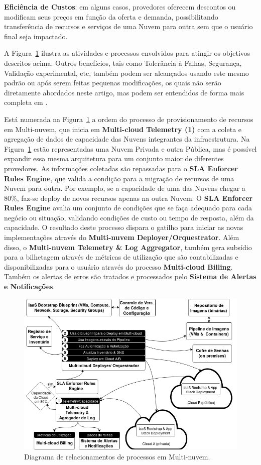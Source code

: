 \documentclass[12pt]{article}
\begin{document}
	\textbf{Eficiência de Custos}: em alguns casos, provedores oferecem descontos ou modificam seus preços em função da oferta e demanda, possibilitando transferência de recursos e serviços de uma Nuvem para outra sem que o usuário final seja impactado.
	
	A Figura~\ref{fig:figure1} ilustra as atividades e processos envolvidos para atingir os objetivos descritos acima. Outros benefícios, tais como Tolerância à Falhas, Segurança, Validação experimental, etc, também podem ser alcançados usando este mesmo padrão ou após serem feitas pequenas modificações, os quais não serão diretamente abordados neste artigo, mas podem ser entendidos de forma mais completa em \cite{Fisher:2018}.
	
	Está numerada na Figura~\ref{fig:figure1} a ordem do processo de provisionamento de recursos em Multi-nuvem, que inicia em \textbf{Multi-cloud Telemetry (1)} com a coleta e agregação de dados de capacidade das Nuvens integrantes da infraestrutura. Na Figura~\ref{fig:figure1} estão representadas uma Nuvem Privada e outra Pública, mas é possível expandir essa mesma arquitetura para um conjunto maior de diferentes provedores. As informações coletadas são repassadas para o \textbf{SLA Enforcer Rules Engine}, que valida a condição para a migração de recursos de uma Nuvem para outra. Por exemplo, se a capacidade de uma das Nuvens chegar a 80\%, faz-se deploy de novos recursos apenas na outra Nuvem. O \textbf{SLA Enforcer Rules Engine} avalia um conjunto de condições que se faça adequado para cada negócio ou situação, validando condições de custo ou tempo de resposta, além da capacidade. O resultado deste processo dispara o gatilho para iniciar as novas implementações através do \textbf{Multi-nuvem Deployer/Orquestrator}. Além disso, o \textbf{Multi-nuvem Telemetry \& Log Aggregator}, também gera subsídio para a bilhetagem através de métricas de utilização que são contabilizadas e disponibilizadas para o usuário através do processo \textbf{Multi-cloud Billing}. Também os alertas de erros são tratados e processados pelo \textbf{Sistema de Alertas e Notificações}.
		
	\begin{figure}[H]
		\centering
		\includegraphics[width=0.9\linewidth]{figuras/Figure1.png}
		\caption{Diagrama de relacionamentos de processos em Multi-nuvem.}
		\label{fig:figure1}
	\end{figure}
\end{document}
